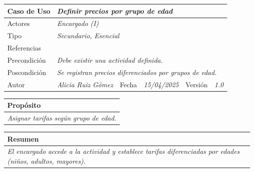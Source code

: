 \begin{table}[H]
    \centering
    \begin{tabular}{llllllll}
    \hline
    \multicolumn{1}{|l|}{Caso de Uso} & \multicolumn{5}{l|}{{\color[HTML]{808080} \textit{Definir precios por grupo de edad}}} & \multicolumn{2}{l|}{\cellcolor[HTML]{E6E6E6}{\color[HTML]{808080} \textit{CU-24}}} \\ \hline
    \multicolumn{1}{|l|}{Actores} & \multicolumn{7}{l|}{{\color[HTML]{808080} \textit{Encargado (I)}}} \\ \hline
    \multicolumn{1}{|l|}{Tipo} & \multicolumn{7}{l|}{{\color[HTML]{808080} \textit{Secundario, Esencial}}} \\ \hline
    \multicolumn{1}{|l|}{Referencias} & \multicolumn{7}{l|}{{\color[HTML]{808080} \textit{}}} \\ \hline
    \multicolumn{1}{|l|}{Precondición} & \multicolumn{7}{p{10cm}|}{{\color[HTML]{808080} \textit{Debe existir una actividad definida.}}} \\ \hline
    \multicolumn{1}{|l|}{Poscondición} & \multicolumn{7}{p{10cm}|}{{\color[HTML]{808080} \textit{Se registran precios diferenciados por grupos de edad.}}} \\ \hline
    \multicolumn{1}{|l|}{Autor} & \multicolumn{1}{l|}{{\color[HTML]{808080} \textit{Alicia Ruiz Gómez}}} & \multicolumn{2}{l|}{Fecha} & \multicolumn{1}{l|}{{\color[HTML]{808080} \textit{15/04/2025}}} & \multicolumn{2}{l|}{Versión} & \multicolumn{1}{l|}{{\color[HTML]{808080} \textit{1.0}}} \\ \hline
    \end{tabular}
    \end{table}
    
    \begin{table}[H]
    \begin{tabular}{llllllll}
    \hline
    \multicolumn{8}{|l|}{\cellcolor[HTML]{F2F2F2}Propósito} \\ \hline
    \multicolumn{8}{|p{15cm}|}{{\color[HTML]{808080} \textit{Asignar tarifas según grupo de edad.}}} \\ \hline
    \end{tabular}
    \end{table}
    
    \begin{table}[H]
    \begin{tabular}{llllllll}
    \hline
    \multicolumn{8}{|l|}{\cellcolor[HTML]{F2F2F2}Resumen} \\ \hline
    \multicolumn{8}{|p{15cm}|}{{\color[HTML]{808080} \textit{El encargado accede a la actividad y establece tarifas diferenciadas por edades (niños, adultos, mayores).}}} \\ \hline
    \end{tabular}
    \end{table}
    
